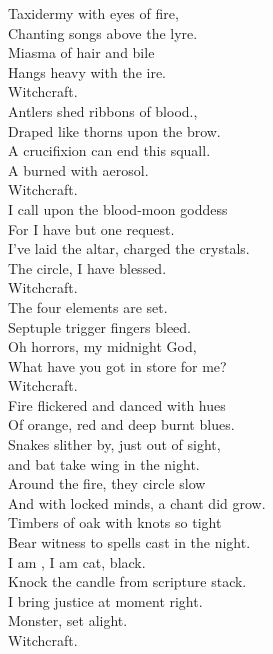 Taxidermy with eyes of fire, \\
Chanting songs above the lyre. \\
Miasma of hair and bile \\
Hangs heavy with the  ire. \\
Witchcraft. \\

Antlers shed ribbons of blood., \\
Draped like thorns upon the brow. \\
A crucifixion can end this squall. \\
A  burned with aerosol. \\
Witchcraft. \\

I call upon the blood-moon goddess \\
For I have but one request. \\
I've laid the altar, charged the crystals. \\
The circle, I have blessed. \\
Witchcraft. \\

The four elements are set. \\
Septuple trigger fingers bleed. \\
Oh horrors, my midnight God, \\
What have you got in store for me? \\
Witchcraft. \\

Fire flickered and danced with hues \\
Of orange, red and deep burnt blues. \\
Snakes slither by, just out of sight, \\
 and bat take wing in the night. \\
Around the fire, they circle slow \\
And with locked minds, a chant did grow. \\
Timbers of oak with knots so tight \\
Bear witness to spells cast in the night. \\

I am , I am cat, black. \\
Knock the candle from scripture stack. \\
I bring justice at moment right. \\
 Monster, set alight. \\
Witchcraft. \\

